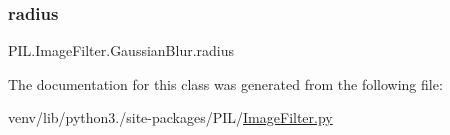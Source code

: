 \mbox{\label{classPIL_1_1ImageFilter_1_1GaussianBlur_a6ea73d1293ef5c4a5053c34a304a806b}} 
\subsubsection{\texorpdfstring{radius}{radius}}
{\footnotesize\ttfamily P\+I\+L.\+Image\+Filter.\+Gaussian\+Blur.\+radius}



The documentation for this class was generated from the following file\+:\begin{DoxyCompactItemize}
\item 
venv/lib/python3./site-\/packages/\+P\+I\+L/\hyperlink{ImageFilter_8py}{Image\+Filter.\+py}\end{DoxyCompactItemize}
